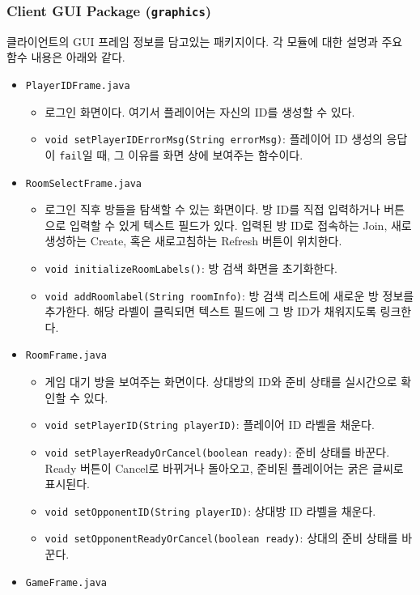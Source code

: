 \documentclass[a4paper, 10pt]{article}
\begin{document}
\subsubsection{Client GUI Package (\texttt{graphics})}
클라이언트의 GUI 프레임 정보를 담고있는 패키지이다. 각 모듈에 대한 설명과 주요
함수 내용은 아래와 같다.
\begin{itemize}
  \item \texttt{PlayerIDFrame.java}
  \begin{itemize}
    \item[] 로그인 화면이다. 여기서 플레이어는 자신의 ID를 생성할 수 있다.
    \item \texttt{void setPlayerIDErrorMsg(String errorMsg)}: 플레이어 ID 생성의 응답이 \texttt{fail}일 때, 그 이유를
    화면 상에 보여주는 함수이다.
  \end{itemize}
  \item \texttt{RoomSelectFrame.java}
  \begin{itemize}
    \item[] 로그인 직후 방들을 탐색할 수 있는 화면이다. 방 ID를 직접 입력하거나 버튼으로 입력할 수 있게 텍스트 필드가 있다.
    입력된 방 ID로 접속하는 Join, 새로 생성하는 Create, 혹은 새로고침하는 Refresh 버튼이 위치한다. 
    \item \texttt{void initializeRoomLabels()}: 방 검색 화면을 초기화한다.
    \item \texttt{void addRoomlabel(String roomInfo)}: 방 검색 리스트에 새로운 방 정보를 추가한다.
    해당 라벨이 클릭되면 텍스트 필드에 그 방 ID가 채워지도록 링크한다.
  \end{itemize}
  \item \texttt{RoomFrame.java}
  \begin{itemize}
    \item[] 게임 대기 방을 보여주는 화면이다. 상대방의 ID와 준비 상태를 실시간으로 확인할 수 있다.
    \item \texttt{void setPlayerID(String playerID)}: 플레이어 ID 라벨을 채운다.
    \item \texttt{void setPlayerReadyOrCancel(boolean ready)}: 준비 상태를 바꾼다. Ready 버튼이 Cancel로 바뀌거나 돌아오고,
    준비된 플레이어는 굵은 글씨로 표시된다.
    \item \texttt{void setOpponentID(String playerID)}: 상대방 ID 라벨을 채운다.
    \item \texttt{void setOpponentReadyOrCancel(boolean ready)}: 상대의 준비 상태를 바꾼다.
  \end{itemize}
  \item \texttt{GameFrame.java}

\end{itemize}
\end{document}
